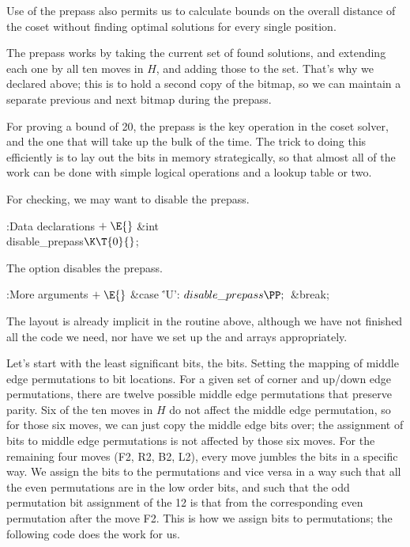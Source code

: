 Use of the prepass also permits us to calculate bounds on the overall
distance of the coset without finding optimal solutions for every single
position.

The prepass works by taking the current set of found solutions, and
extending each one by all ten moves in $H$, and adding those to the
set.  That's why we declared  above; this is to hold a second
copy of the bitmap, so we can maintain a separate previous and
next bitmap during the prepass.

For proving a bound of 20, the prepass is the key operation in the
coset solver, and the one that will take up the bulk of the time.
The trick to doing this efficiently is to lay out the bits in memory
strategically, so that almost all of the work can be done with
simple logical operations and a lookup table or two.

For checking, we may want to disable the prepass.

\Y\B\4:Data declarations\X${}\mathrel+\E{}$\6
\&{int} \\{disable\_prepass}${}\K\T{0}{}$;\par
\fi

The  option disables the prepass.

\Y\B\4:More arguments\X${}\mathrel+\E{}$\6
\4\&{case} \.{'U'}:\5
${}\\{disable\_prepass}\PP;{}$\6
\&{break};\par
\fi

The layout is already implicit in the  routine above,
although
we have not finished all the code we need, nor have we set up the
 and  arrays appropriately.

Let's start with the least significant bits, the  bits.
Setting the mapping of middle edge permutations to bit locations.
For a given set of corner and up/down edge permutations, there are
twelve possible middle edge permutations that preserve parity.
Six of the ten moves in $H$ do not affect the middle edge
permutation, so for those six moves, we can just copy the middle
edge bits over; the assignment of bits to middle edge permutations
is not affected by those six moves.  For the remaining four
moves (F2, R2, B2, L2), every move jumbles the bits in a specific way.
We assign the bits to the permutations and vice versa in a way such
that all the even permutations are in the low order bits, and such
that the odd permutation bit assignment of the 12 is that from
the corresponding even permutation after the move F2.  This is how
we assign bits to permutations; the following code does the work
for us.

